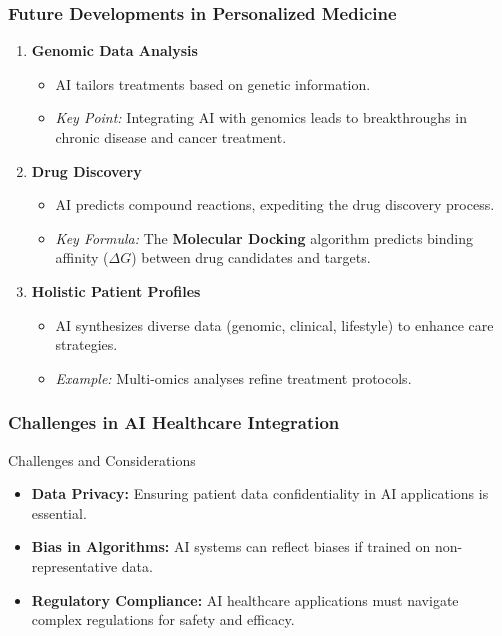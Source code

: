 \documentclass[aspectratio=169]{beamer}
\begin{document}
\begin{frame}[fragile]
    \frametitle{Future Developments in Personalized Medicine}
    \begin{enumerate}
        \item \textbf{Genomic Data Analysis}
            \begin{itemize}
                \item AI tailors treatments based on genetic information.
                \item \textit{Key Point:} Integrating AI with genomics leads to breakthroughs in chronic disease and cancer treatment.
            \end{itemize}
        \item \textbf{Drug Discovery}
            \begin{itemize}
                \item AI predicts compound reactions, expediting the drug discovery process.
                \item \textit{Key Formula:} The \textbf{Molecular Docking} algorithm predicts binding affinity (\(\Delta G\)) between drug candidates and targets.
            \end{itemize}
        \item \textbf{Holistic Patient Profiles}
            \begin{itemize}
                \item AI synthesizes diverse data (genomic, clinical, lifestyle) to enhance care strategies.
                \item \textit{Example:} Multi-omics analyses refine treatment protocols.
            \end{itemize}
    \end{enumerate}
\end{frame}

\begin{frame}[fragile]
    \frametitle{Challenges in AI Healthcare Integration}
    \begin{block}{Challenges and Considerations}
        \begin{itemize}
            \item \textbf{Data Privacy:} Ensuring patient data confidentiality in AI applications is essential.
            \item \textbf{Bias in Algorithms:} AI systems can reflect biases if trained on non-representative data.
            \item \textbf{Regulatory Compliance:} AI healthcare applications must navigate complex regulations for safety and efficacy.
        \end{itemize}
    \end{block}
\end{frame}
\end{document}
